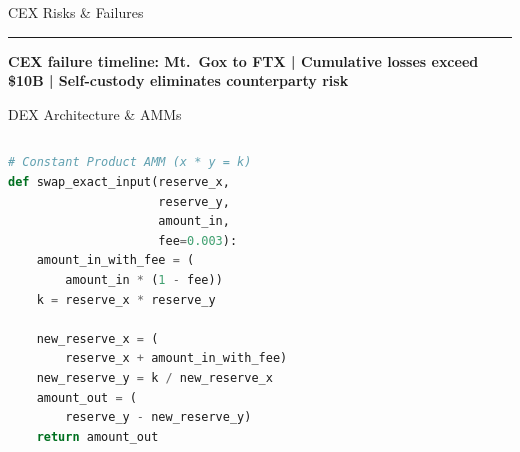 \documentclass[8pt,aspectratio=169]{beamer}
\newcommand{\bottomnote}[1]{\vfill\vspace{-2mm}\textcolor{mllavender2}{\rule{\textwidth}{0.4pt}}\vspace{1mm}\footnotesize\textbf{#1}}
\begin{document}
\begin{frame}{CEX Risks \& Failures}
\bottomnote{CEX failure timeline: Mt.\ Gox to FTX | Cumulative losses exceed \$10B | Self-custody eliminates counterparty risk}
\end{frame}

\begin{frame}[fragile]{DEX Architecture \& AMMs}
\begin{columns}[T]
\begin{lstlisting}[language=Python, caption={Constant Product AMM (x * y = k)}]
# Constant Product AMM (x * y = k)
def swap_exact_input(reserve_x,
                     reserve_y,
                     amount_in,
                     fee=0.003):
    amount_in_with_fee = (
        amount_in * (1 - fee))
    k = reserve_x * reserve_y

    new_reserve_x = (
        reserve_x + amount_in_with_fee)
    new_reserve_y = k / new_reserve_x
    amount_out = (
        reserve_y - new_reserve_y)
    return amount_out


\end{lstlisting}
\end{columns}
\end{frame}
\end{document}
